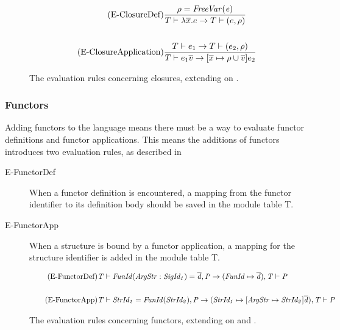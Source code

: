 \begin{figure}[htb]
\begin{align*}
\tag{E-ClosureDef}
&\frac
{\rho = \mathit{FreeVar(e)}}
{T \vdash \lambda \overline{x}.e \rightarrow T \vdash (e,\rho)}
\\
\\
\tag{E-ClosureApplication}
&\frac
{T \vdash e_{1} \rightarrow T \vdash (e_{2}, \rho)}
{T \vdash e_{1} \overline{v} \rightarrow [\overline{x} \mapsto \rho \cup \overline{v}] e_{2}}
\end{align*}
\caption[Closure Evaluation Rules]{The evaluation rules concerning closures, extending on . \label{fig:ClosureEvaluationRules}}
\end{figure}


\subsubsection{Functors}
Adding functors to the language means there must be a way to evaluate functor definitions and functor applications.
This means the additions of functors introduces two evaluation rules, as described in 
\begin{description}
\item[E-FunctorDef]
When a functor definition is encountered, a mapping from the functor identifier to its definition body should be saved in the module table T.
\item[E-FunctorApp]
When a structure is bound by a functor application, a mapping for the structure identifier is added in the module table T.

\end{description}

\begin{figure}[htb]
\begin{align*}
\tag{E-FunctorDef}
&\mathit{T \vdash FunId(ArgStr:SigId_{1}) = \overline{d}, P \rightarrow (FunId \mapsto \overline{d}), T \vdash P}
\\
\\
\tag{E-FunctorApp}
&\mathit{T \vdash StrId_{1} = FunId(StrId_{2}), P \rightarrow (StrId_{1} \mapsto [ArgStr \mapsto StrId_{2}]\overline{d}), T \vdash P}
\end{align*}
\caption[Functor Evaluation Rules]{The evaluation rules concerning functors, extending on  and . \label{fig:FunctorEvaluationRules}}
\end{figure}


